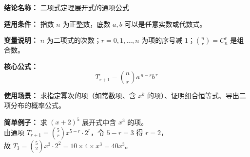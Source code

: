 \textbf{结论名称：} 二项式定理展开式的通项公式

\textbf{适用条件：} 指数 \(n\) 为正整数，底数 \(a,b\) 可以是任意实数或代数式。

\textbf{变量说明：} \(n\) 为二项式的次数；\(r=0,1,\dots,n\) 为项的序号减 1；\(\binom{n}{r}=C_n^r\) 是组合数。

\textbf{核心公式：}
\[
\boxed{T_{r+1} = \binom{n}{r} a^{\,n-r} b^{\,r}}
\]

\textbf{使用场景：} 求指定幂次的项（如常数项、含 \(x^k\) 的项）、证明组合恒等式、导出二项分布的概率公式。

\textbf{简单例子：} 求 \((x+2)^5\) 展开式中含 \(x^3\) 的项。\\
由通项 \(T_{r+1} = \binom{5}{r} x^{5-r} \cdot 2^{r}\)，令 \(5-r=3\) 得 \(r=2\)，\\
故 \(T_{3} = \binom{5}{2} x^{3} \cdot 2^{2} = 10 \times 4 \times x^{3} = 40x^{3}\)。